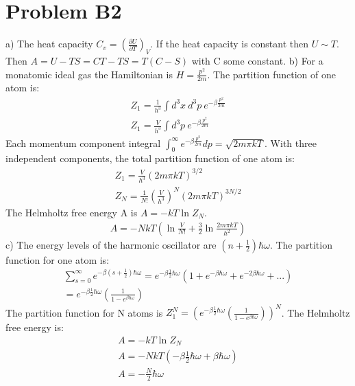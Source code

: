 \documentclass[a4paper,11pt]{article}
\numberwithin{equation}{section}
\begin{document}
\section{Problem B2}
a) The heat capacity $C_v=(\frac{\partial U}{\partial T})_V$.
If the heat capacity is constant then $U\sim T$.
Then $A=U-TS=CT-TS=T(C-S)$ with C some constant.
b) For a monatomic ideal gas the Hamiltonian is $H=\frac{p^2}{2m}$.
The partition function of one atom is:
\begin{gather}
 Z_1=\frac{1}{h^3}\int d^3x\ d^3p\ e^{-\beta \frac{p^2}{2m}}\\
 Z_1 = \frac{V}{h^3}\int d^3p\ e^{-\beta \frac{p^2}{2m}}
\end{gather}
Each momentum component integral $\int_0^\infty e^{-\beta \frac{p^2}{2m}} dp=\sqrt{2m\pi kT}$.
With three independent components, the total partition function of one atom is:
\begin{gather}
 Z_1=\frac{V}{h^3}(2m\pi kT )^{3/2}\\
 Z_N=\frac{1}{N!}(\frac{V}{h^3})^N(2m\pi kT )^{3N/2}
\end{gather}
The Helmholtz free energy A is $A=-kT\ln{Z_N}$.
\begin{gather}
 A = -NkT(\ln{\frac{V}{N!}}+\frac{3}{2}\ln{\frac{2m\pi kT}{h^2}} )
\end{gather}
c) The energy levels of the harmonic oscillator are $(n+\frac{1}{2})\hbar \omega$. 
The partition function for one atom is:
\begin{gather}
 \sum_{s=0}^\infty e^{-\beta(s+\frac{1}{2})\hbar \omega}=e^{-\beta\frac{1}{2}\hbar\omega}(1+e^{-\beta\hbar\omega}+e^{-2\beta\hbar\omega}+...)\\
 =e^{-\beta\frac{1}{2}\hbar\omega}(\frac{1}{1-e^{\beta\hbar\omega}})
\end{gather}
The partition function for N atoms is $Z_1^N=\left(e^{-\beta\frac{1}{2}\hbar\omega}(\frac{1}{1-e^{\beta\hbar\omega}})\right)^N$.
The Helmholtz free energy is:
\begin{gather}
 A=-kT\ln{Z_N}\\
 A=-NkT(-\beta\frac{1}{2}\hbar\omega+\beta\hbar\omega)\\
 A=-\frac{N}{2}\hbar\omega
\end{gather}
\end{document}
